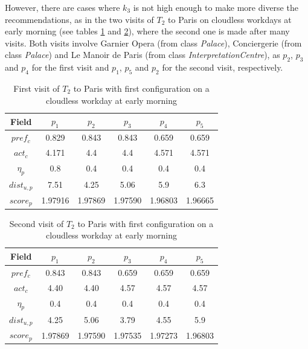 However, there are cases where $k_3$ is not high enough to make more diverse the recommendations, as in the two visits of $T_2$ to Paris on cloudless workdays at early morning (see tables \ref{table:t2-3} and \ref{table:t2-4}), where the second one is made after many visits. Both visits involve Garnier Opera (from class \textit{Palace}), Conciergerie (from class \textit{Palace}) and Le Manoir de Paris (from class \textit{InterpretationCentre}), as $p_2$, $p_3$ and $p_4$ for the first visit and $p_1$, $p_5$ and $p_2$ for the second visit, respectively.

\begin{table}[h!]
    \centering
    \begin{tabular}{ |c|c|c|c|c|c| } 
        \hline
        Field   & $p_1$ & $p_2$ & $p_3$ & $p_4$ & $p_5$ \\
        \hline
        $pref_c$    &  0.829 & 0.843 & 0.843 & 0.659 & 0.659 \\
        $act_c$     & 4.171 & 4.4 & 4.4 & 4.571 & 4.571 \\
        $\eta_p$    & 0.8 & 0.4 & 0.4 & 0.4 & 0.4 \\
        $dist_{u,p}$ & 7.51 & 4.25 & 5.06 & 5.9 & 6.3 \\
        $score_p$    & 1.97916 & 1.97869 & 1.97590 & 1.96803 & 1.96665 \\
        
        \hline
    \end{tabular}
    \caption{First visit of $T_2$ to Paris with first configuration on a cloudless workday at early morning}
    \label{table:t2-3}
\end{table}

\begin{table}[h!]
    \centering
    \begin{tabular}{ |c|c|c|c|c|c| } 
        \hline
        Field   & $p_1$ & $p_2$ & $p_3$ & $p_4$ & $p_5$ \\
        \hline
        $pref_c$    &  0.843 & 0.843 & 0.659 & 0.659 & 0.659 \\
        $act_c$     & 4.40 & 4.40 & 4.57 & 4.57 & 4.57  \\
        $\eta_p$    & 0.4 & 0.4 & 0.4 & 0.4 & 0.4 \\
        $dist_{u,p}$ & 4.25 & 5.06 & 3.79 & 4.55 & 5.9 \\
        $score_p$    & 1.97869 & 1.97590 & 1.97535 & 1.97273 & 1.96803 \\
        
        \hline
    \end{tabular}
    \caption{Second visit of $T_2$ to Paris with first configuration on a cloudless workday at early morning}
    \label{table:t2-4}
\end{table}

